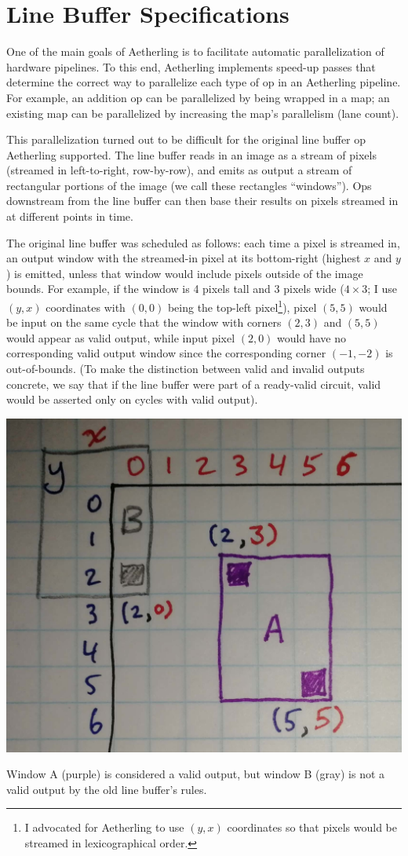 \documentclass[12pt]{article}
\begin{document}
\section{Line Buffer Specifications}

One of the main goals of Aetherling is to facilitate automatic
parallelization of hardware pipelines. To this end, Aetherling
implements speed-up passes that determine the correct way to
parallelize each type of op in an Aetherling pipeline. For example, an
addition op can be parallelized by being wrapped in a map; an existing
map can be parallelized by increasing the map's parallelism (lane
count).

This parallelization turned out to be difficult for the original line
buffer op Aetherling supported. The line buffer reads in an image as a
stream of pixels (streamed in left-to-right, row-by-row), and emits as
output a stream of rectangular portions of the image (we call these
rectangles ``windows''). Ops downstream from the line buffer can then
base their results on pixels streamed in at different points in time.

The original line buffer was scheduled as follows: each time a pixel
is streamed in, an output window with the streamed-in pixel at its
bottom-right (highest $x$ and $y$) is emitted, unless that window
would include pixels outside of the image bounds. For example, if the
window is 4 pixels tall and 3 pixels wide ($4 \times 3$; I use $(y,x)$
coordinates with $(0,0)$ being the top-left pixel\footnote{I advocated
  for Aetherling to use $(y,x)$ coordinates so that pixels would be
  streamed in lexicographical order.}), pixel $(5,5)$ would be input
on the same cycle that the window with corners $(2,3)$ and $(5,5)$
would appear as valid output, while input pixel $(2,0)$ would have no
corresponding valid output window since the corresponding corner $(-1,
-2)$ is out-of-bounds. (To make the distinction between valid and
invalid outputs concrete, we say that if the line buffer were part
of a ready-valid circuit, valid would be asserted only on cycles
with valid output).

\begin{center}
\includegraphics[width=0.5\linewidth]{Figures/old-line-buffer.jpg}

Window A (purple) is considered a valid output, but window B
(gray) is not a valid output by the old line buffer's rules.
\end{center}
\end{document}
